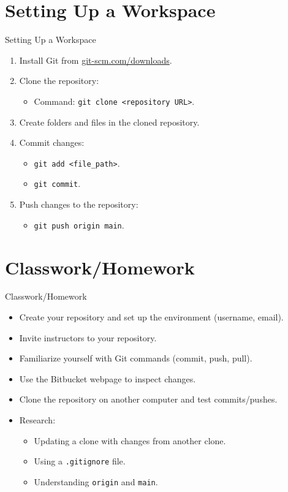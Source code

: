 \section{Setting Up a Workspace}
\begin{frame}{Setting Up a Workspace}
  \begin{enumerate}
    \item Install Git from \href{https://git-scm.com/downloads}{git-scm.com/downloads}.
    \item Clone the repository:
    \begin{itemize}
      \item Command: \texttt{git clone <repository URL>}.
    \end{itemize}
    \item Create folders and files in the cloned repository.
    \item Commit changes:
    \begin{itemize}
      \item \texttt{git add <file\_path>}.
      \item \texttt{git commit}.
    \end{itemize}
    \item Push changes to the repository:
    \begin{itemize}
      \item \texttt{git push origin main}.
    \end{itemize}
  \end{enumerate}
\end{frame}

\section{Classwork/Homework}
\begin{frame}{Classwork/Homework}
  \begin{itemize}
    \item Create your repository and set up the environment (username, email).
    \item Invite instructors to your repository.
    \item Familiarize yourself with Git commands (commit, push, pull).
    \item Use the Bitbucket webpage to inspect changes.
    \item Clone the repository on another computer and test commits/pushes.
    \item Research:
    \begin{itemize}
      \item Updating a clone with changes from another clone.
      \item Using a \texttt{.gitignore} file.
      \item Understanding \texttt{origin} and \texttt{main}.
    \end{itemize}
  \end{itemize}
\end{frame}


